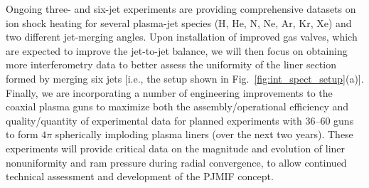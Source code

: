 \documentclass[journal]{IEEEtran}
\begin{document}
Ongoing three- and six-jet
experiments are providing comprehensive datasets on ion shock heating for 
several plasma-jet species (H, He, N, Ne, Ar, Kr, Xe)
and two different jet-merging angles.  Upon installation
of improved gas valves, which are
expected to improve the jet-to-jet balance, we will then focus on obtaining
more interferometry data to better assess the uniformity of the liner section formed by merging
six jets [i.e., the setup shown in Fig.~\ref{fig:int_spect_setup}(a)].  Finally, we are
incorporating a number of engineering improvements to the coaxial plasma guns to maximize
both the assembly/operational efficiency and quality/quantity of experimental data for 
planned experiments with
36--60 guns to form $4\pi$ spherically imploding plasma liners (over the next two years).
These experiments will provide critical data on the magnitude
and evolution of liner nonuniformity and
ram pressure during radial convergence, to allow continued technical assessment 
and development of the PJMIF concept.





%
%
\end{document}

